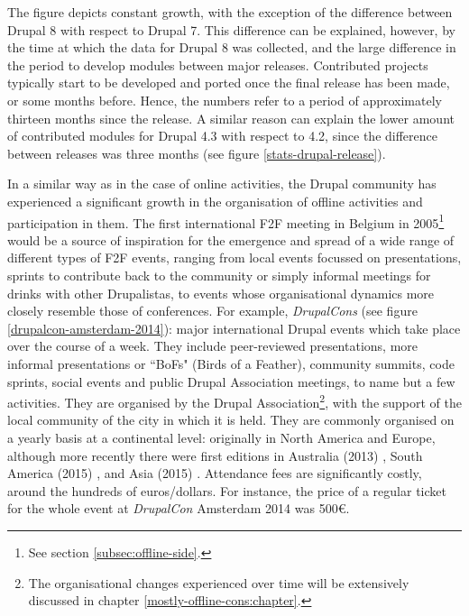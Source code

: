 The figure depicts constant growth, with the exception of the difference between Drupal 8 with respect to Drupal 7. This difference can be explained, however, by the time at which the data for Drupal 8 was collected, and the large difference in the period to develop modules between major releases. Contributed projects typically start to be developed and ported once the final release has been made, or some months before. Hence, the numbers refer to a period of approximately thirteen months since the release. A similar reason can explain the lower amount of contributed modules for Drupal 4.3 with respect to 4.2, since the difference between releases was three months (see figure \ref{stats-drupal-release}).

In a similar way as in the case of online activities, the Drupal community has experienced a significant growth in the organisation of offline activities and participation in them. The first international F2F meeting in Belgium in 2005\footnote{See section \ref{subsec:offline-side}.} would be a source of inspiration for the emergence and spread of a wide range of different types of F2F events, ranging from local events focussed on presentations, sprints to contribute back to the community or simply informal meetings for drinks with other Drupalistas, to events whose organisational dynamics more closely resemble those of conferences. For example, \textit{DrupalCons} (see figure \ref{drupalcon-amsterdam-2014}): major international Drupal events which take place over the course of a week. They include peer-reviewed presentations, more informal presentations or ``BoFs" (Birds of a Feather), community summits, code sprints, social events and public Drupal Association meetings, to name but a few activities. They are organised by the Drupal Association\footnote{The organisational changes experienced over time will be extensively discussed in chapter \ref{mostly-offline-cons:chapter}.}, with the support of the local community of the city in which it is held. They are commonly organised on a yearly basis at a continental level: originally in North America and Europe, although more recently there were first editions in Australia (2013) \parencite{drupalcon-aus:2016:Online}, South America (2015) \parencite{drupalcon-sa:2016:Online}, and Asia (2015) \parencite{drupalcon-asia:2016:Online}. Attendance fees are significantly costly, around the hundreds of euros\slash dollars. For instance, the price of a regular ticket for the whole event at \textit{DrupalCon} Amsterdam 2014 was 500\euro{}.


